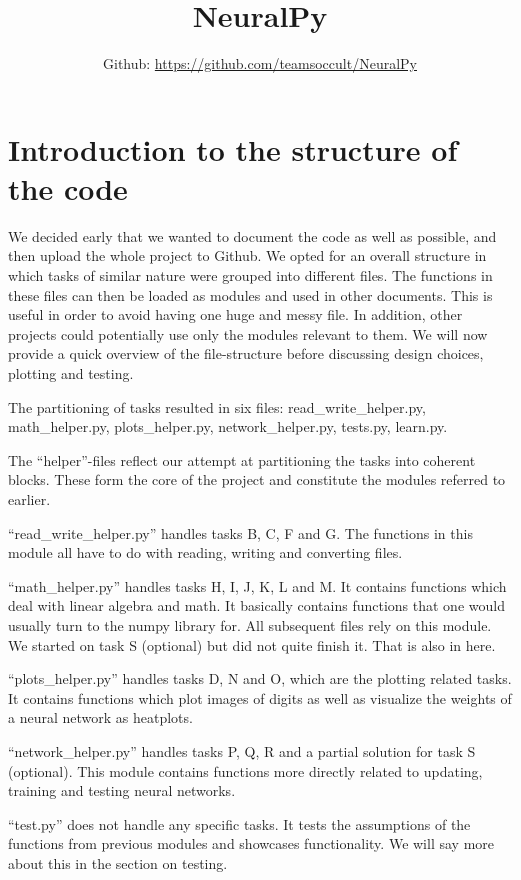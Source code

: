 \documentclass[letterpaper, 12 pt, conference]{ieeeconf}
\title{\LARGE \bf
NeuralPy
}
\author{Github: \url{https://github.com/teamsoccult/NeuralPy}}
\begin{document}
\maketitle

\section{Introduction to the structure of the code}

We decided early that we wanted to document the code as well as possible, and then upload the whole project to Github. 
We opted for an overall structure in which tasks of similar nature were grouped into different files. The functions in these files can then be loaded as modules and used in other documents. This is useful in order to avoid having one huge and messy file. In addition, other projects could potentially use only the modules relevant to them. We will now provide a quick overview of the file-structure before discussing design choices, plotting and testing.

The partitioning of tasks resulted in six files: 
read\_write\_helper.py, math\_helper.py, plots\_helper.py, network\_helper.py, tests.py, learn.py. 

The “helper”-files reflect our attempt at partitioning the tasks into coherent blocks. These form the core of the project and constitute the modules referred to earlier. 

“read\_write\_helper.py” handles tasks B, C, F and G. The functions in this module all have to do with reading, writing and converting files. 

“math\_helper.py” handles tasks H, I, J, K, L and M. It contains functions which deal with linear algebra and math. It basically contains functions that one would usually turn to the numpy library for. All subsequent files rely on this module.  
We started on task S (optional) but did not quite finish it. That is also in here. 

“plots\_helper.py” handles tasks D, N and O, which are the plotting related tasks. It contains functions which plot images of digits as well as visualize the weights of a neural network as heatplots. 

“network\_helper.py” handles tasks P, Q, R and a partial solution for task S (optional). This module contains functions more directly related to updating, training and testing neural networks.

“test.py” does not handle any specific tasks. It tests the assumptions of the functions from previous modules and showcases functionality. We will say more about this in the section on testing. 
\end{document}
